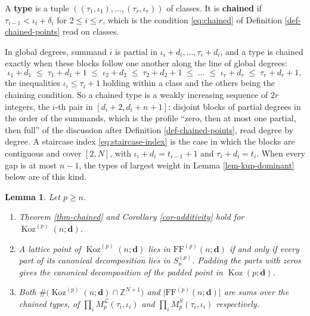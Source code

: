 \documentclass[11pt, a4paper, abstract=yes]{scrartcl}
\theoremstyle{definition}
\theoremstyle{remark}
\theoremstyle{plain}
\newtheorem{lemma}[definition]{Lemma}
\newcommand{\vek}[1]{\boldsymbol{#1}}
\theoremstyle{remark}
\theoremstyle{plain}
\newcommand{\Koz}{\operatorname{Koz}}
\newcommand{\FF}{\mathrm{FF}}
\newcommand{\leannone}{\tikz[baseline=-0.6ex]\draw[leannone,line width=0.6pt] (0,0) circle (0.55ex);}
\newcommand{\leanmark}[1]{\leavevmode{\reversemarginpar\marginnote{\raggedleft#1}}}
\begin{document}
A \textbf{type} is a tuple \(((\tau_1,\iota_1),\dots,(\tau_r,\iota_r))\) of classes. It is \textbf{chained} if
\(\tau_{i-1}<\iota_i+\delta_i\) for \(2\le i\le r\), which is the condition \eqref{eq:chained} of
Definition \ref{def-chained-points} read on classes.

In global degrees, summand \(i\) is partial in \(\iota_i+d_i,\dots,\tau_i+d_i\), and a type is
chained exactly when these blocks follow one another along the line of global degrees:
\[
  \iota_1+d_1\;\le\;\tau_1+d_1+1\;\le\;\iota_2+d_2\;\le\;\tau_2+d_2+1\;\le\;\dots\;\le\;\iota_r+d_r\;\le\;\tau_r+d_r+1 ,
\]
the inequalities \(\iota_i\le\tau_i+1\) holding within a class and the others being the chaining
condition. So a chained type is a weakly increasing sequence of \(2r\) integers, the \(i\)-th pair in
\([d_i+2,d_i+n+1]\): disjoint blocks of partial degrees in the order of the summands, which is the
profile ``zero, then at most one partial, then full'' of the discussion after
Definition \ref{def-chained-points}, read degree by degree.
A staircase index \eqref{eq:staircase-index} is the case in which the blocks are contiguous and
cover \([2,N]\), with \(\iota_i+d_i=t_{i-1}+1\) and \(\tau_i+d_i=t_i\). When every gap is at most
\(n-1\), the types of largest weight in Lemma \ref{lem-kup-dominant} below are of this kind.

\begin{lemma}
\leanmark{\leannone}Let \(p\ge n\).
\begin{enumerate}
\item Theorem \ref{thm-chained} and Corollary \ref{cor-additivity} hold for \(\Koz^{(p)}(n;\vek d)\).
\item A lattice point of \(\Koz^{(p)}(n;\vek d)\) lies in \(\FF^{(p)}(n;\vek d)\) if and only if every
part of its canonical decomposition lies in \(S_n^{(p)}\). Padding the parts with zeros gives the
canonical decomposition of the padded point in \(\Koz(p;\vek d)\).
\item Both \(\#\bigl(\Koz^{(p)}(n;\vek d)\cap\mathbb Z^{N+1}\bigr)\) and
\(\lvert\FF^{(p)}(n;\vek d)\rvert\) are sums over the chained types, of
\(\prod_iM^{\mathcal L}_p(\tau_i,\iota_i)\) and \(\prod_iM^S_p(\tau_i,\iota_i)\) respectively.
\end{enumerate}
\label{lem-kup-truncation}
\end{lemma}
\end{document}
